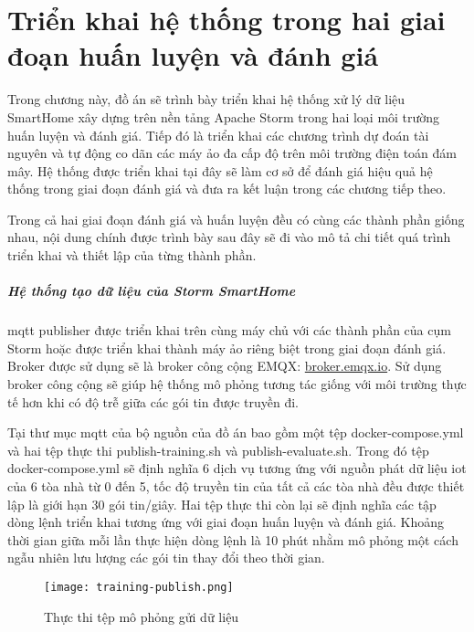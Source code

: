 \chapter{Triển khai hệ thống trong hai giai đoạn huấn luyện và đánh giá}

Trong chương này, đồ án sẽ trình bày triển khai hệ thống xử lý dữ liệu SmartHome xây dựng trên nền tảng Apache Storm trong hai loại môi trường huấn luyện và đánh giá. Tiếp đó là triển khai các chương trình dự đoán tài nguyên và tự động co dãn các máy ảo đa cấp độ trên môi trường điện toán đám mây. Hệ thống được triển khai tại đây sẽ làm cơ sở để đánh giá hiệu quả hệ thống trong giai đoạn đánh giá và đưa ra kết luận trong các chương tiếp theo.

Trong cả hai giai đoạn đánh giá và huấn luyện đều có cùng các thành phần giống nhau, nội dung chính được trình bày sau đây sẽ đi vào mô tả chi tiết quá trình triển khai và thiết lập của từng thành phần.

\paragraph{Hệ thống tạo dữ liệu của Storm SmartHome}

\gls{mqtt} publisher được triển khai trên cùng máy chủ với các thành phần của cụm Storm hoặc được triển khai thành máy ảo riêng biệt trong giai đoạn đánh giá. Broker được sử dụng sẽ là broker công cộng EMQX: \href{broker.emqx.io}{broker.emqx.io}. Sử dụng broker công cộng sẽ giúp hệ thống mô phỏng tương tác giống với môi trường thực tế hơn khi có độ trễ giữa các gói tin được truyền đi.

Tại thư mục \gls{mqtt} của bộ nguồn của đồ án \autocite{lemionday_thesis_storm} bao gồm một tệp docker-compose.yml và hai tệp thực thi publish-training.sh và publish-evaluate.sh. Trong đó tệp docker-compose.yml sẽ định nghĩa 6 dịch vụ tương ứng với nguồn phát dữ liệu \gls{iot} của 6 tòa nhà từ 0 đến 5, tốc độ truyền tin của tất cả các tòa nhà đều được thiết lập là giới hạn 30 gói tin/giây. Hai tệp thực thi còn lại sẽ định nghĩa các tập dòng lệnh triển khai tương ứng với giai đoạn huấn luyện và đánh giá. Khoảng thời gian giữa mỗi lần thực hiện dòng lệnh là 10 phút nhằm mô phỏng một cách ngẫu nhiên lưu lượng các gói tin thay đổi theo thời gian.

\begin{figure}[H]
    \centering
    \texttt{[image: training-publish.png]}
    \caption{Thực thi tệp mô phỏng gửi dữ liệu}
\end{figure}

